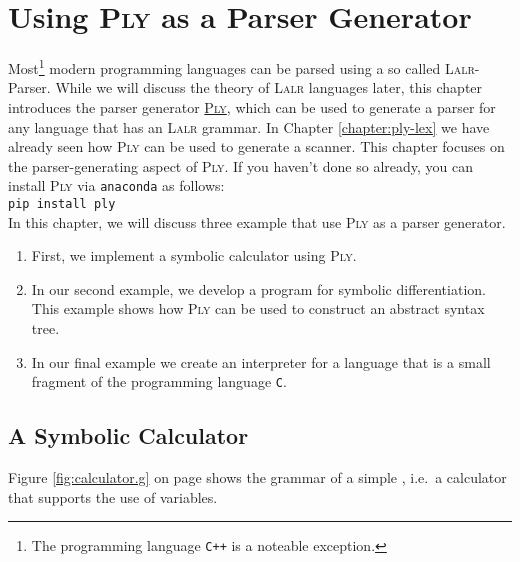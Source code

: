 \chapter{Using \textsc{Ply} as a Parser Generator  \label{chapter:ply}}
Most\footnote{The programming language \texttt{C++} is a noteable exception.} modern programming languages can
be parsed using a so called \textsc{Lalr}-Parser.  While we will discuss the theory of \textsc{Lalr} languages
later, this chapter introduces the parser generator \href{https://www.dabeaz.com/ply/}{\textsc{Ply}}, which can be used to
generate a parser for any language that has an \textsc{Lalr} grammar.  In Chapter \ref{chapter:ply-lex} we have already
seen how \textsc{Ply} can be used to generate a scanner.  This chapter focuses on the parser-generating aspect
of \textsc{Ply}.   If you haven't done so already, you can install \textsc{Ply} via \texttt{anaconda} as follows:
\\[0.2cm]
\hspace*{1.3cm}
\texttt{pip install ply}
\\[0.2cm]
In this chapter, we will discuss three example that use \textsc{Ply} as a parser generator.
\begin{enumerate}
\item First, we implement a symbolic calculator using \textsc{Ply}.
\item In our second example, we develop a program for symbolic differentiation.
      This example shows how \textsc{Ply} can be used to construct an abstract syntax tree.
\item In our final example we create an interpreter for a language that is a small fragment of the
      programming language \texttt{C}.
\end{enumerate}


\section{A Symbolic Calculator}
Figure \ref{fig:calculator.g} on page \pageref{fig:calculator.g} shows the grammar of a simple 
, i.e.~a calculator that supports the use of variables.  


